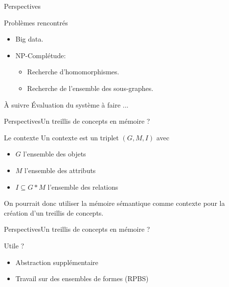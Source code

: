 \begin{frame}{Perspectives}

\begin{block}{Problèmes rencontrés}
\begin{itemize}
\item Big data.
\item NP-Complétude:
\begin{itemize}
\item Recherche d'homomorphismes.
\item Recherche de l'ensemble des sous-graphes.
\end{itemize}
\end{itemize}
\end{block}

\begin{block}{À suivre}
Évaluation du système à faire ...
\end{block}

\end{frame}

\begin{frame}{Perspectives}{Un treillis de concepts en mémoire ?}
\begin{block}{Le contexte}
Un contexte est un triplet $(G,M,I)$ avec
\begin{itemize}
\item $G$ l'ensemble des objets
\item $M$ l'ensemble des attributs
\item $I \subseteq G*M$ l'ensemble des relations
\end{itemize}
On pourrait donc utiliser la mémoire sémantique comme contexte pour la création d'un treillis de concepts.
\end{block}
\end{frame}

\begin{frame}{Perspectives}{Un treillis de concepts en mémoire ?}
\begin{block}{Utile ?}
\begin{itemize}
\item Abstraction supplémentaire
\item Travail sur des ensembles de formes (RPBS)
\end{itemize}
\end{block}
\end{frame}


